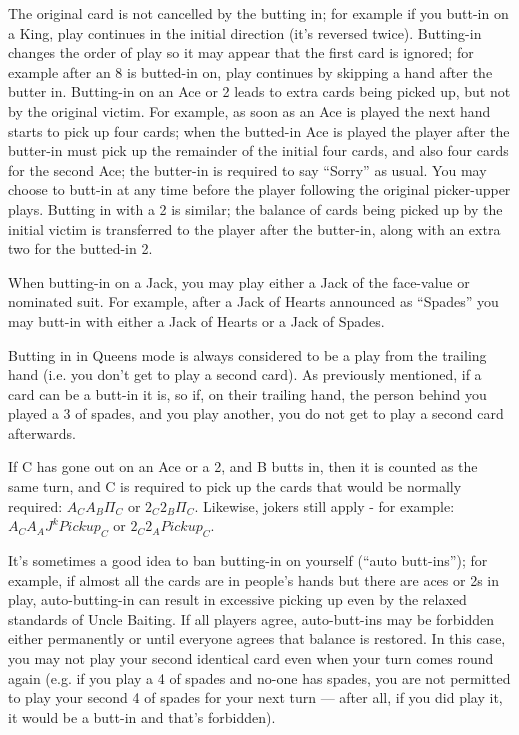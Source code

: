 \documentclass[12pt]{article}
\begin{document}
The original card is not cancelled by the butting in; for example if you butt-in on a King, play continues in
the initial direction (it's reversed twice).  Butting-in changes the order of play so it may appear that the
first card is ignored; for example after an 8 is butted-in on, play continues by skipping a hand after the
butter in.
Butting-in on an Ace or 2 leads to extra cards being picked up, but not by the
original victim.  For example, as soon as an Ace is played the next hand starts to pick up four cards; when
the butted-in Ace is played the player after the butter-in must pick up the remainder of the initial four
cards, and also four cards for the second Ace; the butter-in is required to say ``Sorry'' as usual.  You may
choose to butt-in at any time before the player following the original picker-upper plays.  Butting in with a
2 is similar; the balance of cards being picked up by the initial victim is transferred to the player after
the butter-in, along with an extra two for the butted-in 2.

When butting-in on a Jack, you may play either a Jack of the face-value or nominated suit. For
example, after a Jack of Hearts announced as ``Spades'' you may butt-in with either
a Jack of Hearts or a Jack of Spades.

Butting in in Queens mode is always considered to be a play from the trailing hand (i.e. you
don't get to play a second card). As previously mentioned, if a card can be a butt-in it is, so if, on their trailing hand, the person behind you played a 3 of spades, and you play another, you do not get to play a second card afterwards.

If C has gone out on an Ace or a 2, and B butts in, then it is counted as the same turn, and C is required to pick up the cards that would be normally required: $A_C A_B \Pi_C$ or $2_C 2_B \Pi_C$. Likewise, jokers still apply - for example: $A_C A_A J^k Pickup_C$ or $2_C 2_A Pickup_C$.

It's sometimes a good idea to ban butting-in on yourself (``auto butt-ins''); for example, if almost all the
cards are in people's hands but there are aces or 2s in play, auto-butting-in can result in excessive
picking up even by the relaxed standards of Uncle Baiting.  If all players agree, auto-butt-ins may be
forbidden either permanently or until everyone agrees that balance is restored.  In this case, you may not play
your second identical card even when your turn comes round again (e.g. if you play a 4 of spades and no-one
has spades, you are not permitted to play your second 4 of spades for your next turn --- after all, if you did
play it, it would be a butt-in and that's forbidden).
\end{document}
